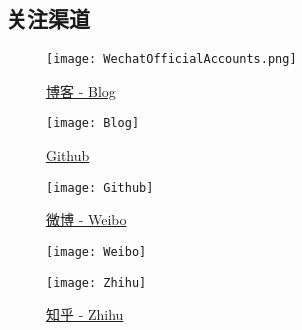 \subsection*{\bfseries \sffamily \hypertarget{follow}{关注渠道}}
\vspace*{-1ex}
\vspace*{-2ex}

\begin{figure}[htbp]
    \centering
    \texttt{[image: WechatOfficialAccounts.png]}
\end{figure}
\vspace*{-4ex}

\begin{figure}[htbp]
    \centering
    \begin{minipage}[t]{0.2\textwidth}
        \centering
        \caption*{\href{https://mister-kin.github.io}{博客 - Blog}}
        \texttt{[image: Blog]}
    \end{minipage}
    \qquad
    \begin{minipage}[t]{0.2\textwidth}
        \centering
        \caption*{\href{https://github.com/mister-kin}{Github}}
        \texttt{[image: Github]}
    \end{minipage}
    \qquad
    \begin{minipage}[t]{0.2\textwidth}
        \centering
        \caption*{\href{https://weibo.com/6270111192/profile?topnav=1&wvr=6&is_all=1}{微博 - Weibo}}
        \texttt{[image: Weibo]}
    \end{minipage}
    \qquad
    \begin{minipage}[t]{0.2\textwidth}
        \centering
        \caption*{\href{https://www.zhihu.com/people/drwu-94}{知乎 - Zhihu}}
        \texttt{[image: Zhihu]}
    \end{minipage}

    \vspace*{3ex}


\end{figure}
